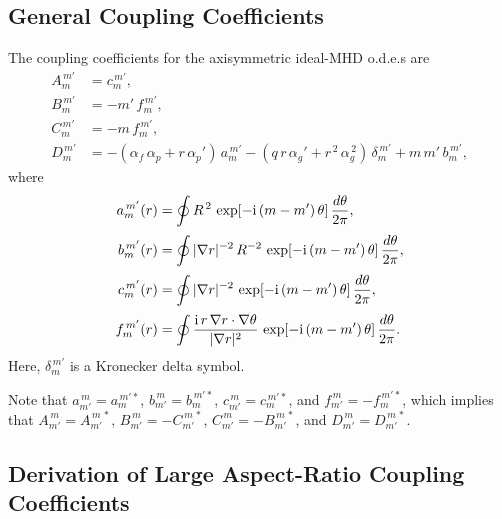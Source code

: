 \documentclass[12pt,prb,aps]{revtex4-1}
\begin{document}
\subsection{General Coupling Coefficients}\label{scoupx}
The coupling coefficients for the axisymmetric ideal-MHD o.d.e.s are
\begin{align}
A_m^{\,m'} &= c_{m}^{\,m'},\\[0.5ex]
B_m^{\,m'} &= - m'\,f_m^{\,m'},\\[0.5ex]
C_{m}^{\,m'} &= -m\,f_m^{\,m'},\\[0.5ex]
D_{m}^{\,m'}&= -(\alpha_f\,\alpha_p+ r\,\alpha_p')\,a_m^{\,m'} - (q\,r\,\alpha_g' +r^{\,2}\,\alpha_g^{\,2})\,\delta_m^{\,m'}+m\,m'\,b_m^{\,m'},\label{Ddef}
\end{align}
where
\begin{align}\label{e73er}
a_m^{\,m'}(r)  &=\oint R^{\,2}\,\exp[-{\rm i}\,(m-m')\,\theta]\,\frac{d\theta}{2\pi},\\[0.5ex]
b_m^{\,m'}(r)  &=\oint|\nabla r|^{-2}\, R^{-2}\,\exp[-{\rm i}\,(m-m')\,\theta]\,\frac{d\theta}{2\pi},\\[0.5ex]
c_m^{\,m'}(r)  &=\oint|\nabla r|^{-2}\,\exp[-{\rm i}\,(m-m')\,\theta]\,\frac{d\theta}{2\pi},\\[0.5ex]
f_{m}^{\,m'}(r)&= \oint \frac{{\rm i}\,r\,\nabla r\cdot\nabla\theta}{|\nabla r|^2}\,\exp[-{\rm i}\,(m-m')\,\theta]\,\frac{d\theta}{2\pi}.\label{e76er}
\end{align}
Here, $\delta_m^{\,m'}$ is a Kronecker delta symbol.

Note   that
$a_{m'}^{\,m} =a_{m}^{\,m'\ast}$, 
$b_{m'}^{\,m} =b_{m}^{\,m'\ast}$, 
$c_{m'}^{\,m} =c_{m}^{\,m'\ast}$, and 
$f_{m'}^{\,m} =-f_{m}^{\,m'\ast}$,
which implies that
$A_{m'}^{\,m} = A_{m'}^{\,m\,\ast}$,
$B_{m'}^{\,m} = -C_{m'}^{\,m\,\ast}$,
$C_{m'}^{\,m} = -B_{m'}^{\,m\,\ast}$, and 
$D_{m'}^{\,m} = D_{m'}^{\,m\,\ast}$.

\subsection{Derivation of Large Aspect-Ratio Coupling Coefficients}\label{slar}
\end{document}
